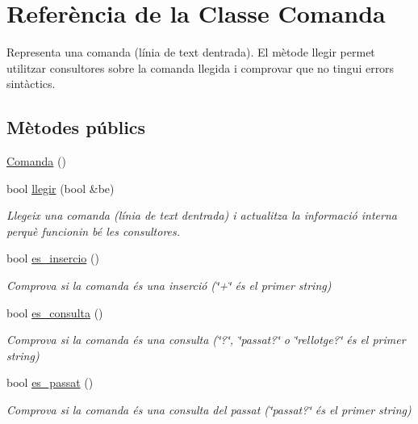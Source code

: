 \hypertarget{class_comanda}{}\section{Referència de la Classe Comanda}
\label{class_comanda}


Representa una comanda (línia de text d\textquotesingle{}entrada). El mètode llegir permet utilitzar consultores sobre la comanda llegida i comprovar que no tingui errors sintàctics.  


\subsection*{Mètodes públics}
\begin{DoxyCompactItemize}
\item 
\hyperlink{class_comanda_a0f09e7aa5b7c15f131020d04bf5a8a94}{Comanda} ()
\item 
bool \hyperlink{class_comanda_af2dbc8ccdbb94bed6ea26155edc71b57}{llegir} (bool \&be)
\begin{DoxyCompactList}\small\item\em Llegeix una comanda (línia de text d\textquotesingle{}entrada) i actualitza la informació interna perquè funcionin bé les consultores. \end{DoxyCompactList}\item 
bool \hyperlink{class_comanda_a614467bedacc9cf29cc5a9dcbba6b23d}{es\+\_\+insercio} ()
\begin{DoxyCompactList}\small\item\em Comprova si la comanda és una inserció (\char`\"{}+\char`\"{} és el primer string) \end{DoxyCompactList}\item 
bool \hyperlink{class_comanda_a847ee227fd7fea3a105dbd78735de453}{es\+\_\+consulta} ()
\begin{DoxyCompactList}\small\item\em Comprova si la comanda és una consulta (\char`\"{}?\char`\"{}, \char`\"{}passat?\char`\"{} o \char`\"{}rellotge?\char`\"{} és el primer string) \end{DoxyCompactList}\item 
bool \hyperlink{class_comanda_a1f435f8b605f0d1f5cbb06c8c6fe4005}{es\+\_\+passat} ()
\begin{DoxyCompactList}\small\item\em Comprova si la comanda és una consulta del passat (\char`\"{}passat?\char`\"{} és el primer string) \end{DoxyCompactList}\item 

\end{DoxyCompactItemize}
